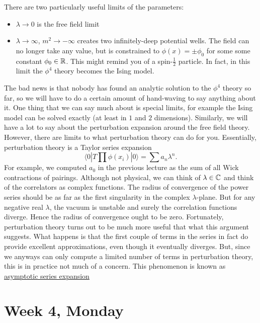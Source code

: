 \documentclass[12pt]{article}
\begin{document}
There are two particularly useful limits of the parameters:
\begin{itemize}
\item $\lambda\to 0$ is the free field limit
\item $\lambda\to \infty$, $m^2\to -\infty$ creates two
  infinitely-deep potential wells. The field can no longer take any
  value, but is constrained to $\phi(x) = \pm \phi_0$ for some some
  constant $\phi_0\in{\mathbb{R}}$. This might remind you of a
  spin-$\tfrac{1}{2}$ particle. In fact, in this limit the $\phi^4$
  theory becomes the Ising model.
\end{itemize}
The bad news is that nobody has found an analytic solution to the
$\phi^4$ theory so far, so we will have to do a certain amount of
hand-waving to say anything about it. One thing that we can say much
about is special limits, for example the Ising model can be solved
exactly (at least in $1$ and $2$ dimensions). Similarly, we will have
a lot to say about the perturbation expansion around the free field
theory. However, there are limits to what perturbation theory can do
for you. Essentially, perturbation theory is a Taylor series expansion
\begin{equation}
  \langle 0|T\prod \phi(x_i)|0\rangle =
  \sum a_n \lambda^n.
\end{equation}
For example, we computed $a_0$ in the previous lecture as the sum of
all Wick contractions of pairings. Although not physical, we can think
of $\lambda \in {\mathbb{C}}$ and think of the correlators as complex
functions. The radius of convergence of the power series should be as
far as the first singularity in the complex $\lambda$-plane. But for
any negative real $\lambda$, the vacuum is unstable and surely the
correlation functions diverge. Hence the radius of convergence ought
to be zero. Fortunately, perturbation theory turns out to be much more
useful that what this argument suggests. What happens is that the
first couple of terms in the series in fact do provide excellent
approximations, even though it eventually diverges. But, since we
anyways can only compute a limited number of terms in perturbation
theory, this is in practice not much of a concern. This phenomenon is
known as
\href{http://en.wikipedia.org/wiki/Asymptotic_expansion}{asymptotic
  series expansion}



\section{Week 4, Monday}
\end{document}
